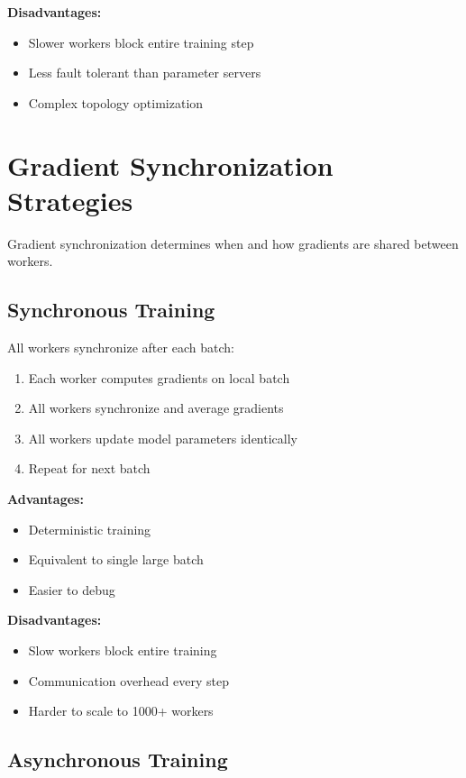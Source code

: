 \textbf{Disadvantages:}
\begin{itemize}
    \item Slower workers block entire training step
    \item Less fault tolerant than parameter servers
    \item Complex topology optimization
\end{itemize}

\section{Gradient Synchronization Strategies}

Gradient synchronization determines when and how gradients are shared between workers.

\subsection{Synchronous Training}

All workers synchronize after each batch:

\begin{enumerate}
    \item Each worker computes gradients on local batch
    \item All workers synchronize and average gradients
    \item All workers update model parameters identically
    \item Repeat for next batch
\end{enumerate}

\textbf{Advantages:}
\begin{itemize}
    \item Deterministic training
    \item Equivalent to single large batch
    \item Easier to debug
\end{itemize}

\textbf{Disadvantages:}
\begin{itemize}
    \item Slow workers block entire training
    \item Communication overhead every step
    \item Harder to scale to 1000+ workers
\end{itemize}

\subsection{Asynchronous Training}

